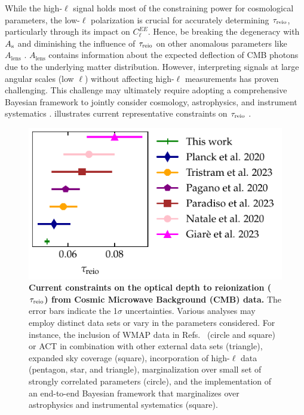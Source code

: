 While the high-$\ell$ signal holds most of the constraining power for
cosmological parameters, the low-$\ell$ polarization is crucial for
accurately determining $\tau_{\mathrm{reio}}$, particularly through its impact on
$C^{EE}_\ell$.
Hence,  be breaking the degeneracy with $A_\mathrm{s}$ and diminishing the influence
of $\tau_{\mathrm{reio}}$ on other anomalous parameters like $A_\mathrm{lens}$
\cite{Giare2023}.
$A_\mathrm{lens}$ contains information about the expected deflection of
CMB photons due to the underlying matter distribution.
However, interpreting signals at large angular scales (low $\ell$)
without affecting high-$\ell$ measurements has proven challenging.
This challenge may ultimately require adopting a comprehensive Bayesian
framework to jointly consider cosmology, astrophysics, and instrument
systematics \cite{Paradiso2023}.
 illustrates current representative constraints on
$\tau_{\mathrm{reio}}$ .

\begin{figure}[tb]
\centering
\includegraphics{figs/tau_fig.pdf}
\caption{\textbf{Current constraints on the optical depth to
reionization ($\tau_{\mathrm{reio}}$) from Cosmic Microwave Background (CMB)
data.}
The error bars indicate the 1$\sigma$ uncertainties.
Various analyses may employ distinct data sets or vary in the parameters
considered.
For instance, the inclusion of WMAP data in Refs.~ \cite{Natale2020,
Paradiso2023} (circle and square) or ACT in combination with other
external data sets \cite{Giare2023} (triangle), expanded sky coverage
\cite{Paradiso2023} (square), incorporation of high-$\ell$ data
\cite{Pagano2020, Planck2020a, Giare2023} (pentagon, star, and
triangle), marginalization over small set of strongly correlated
parameters \cite{Natale2020} (circle), and the implementation of an
end-to-end Bayesian framework that marginalizes over astrophysics and
instrumental systematics \cite{Paradiso2023} (square).}
\label{fig:tau}
\end{figure}

